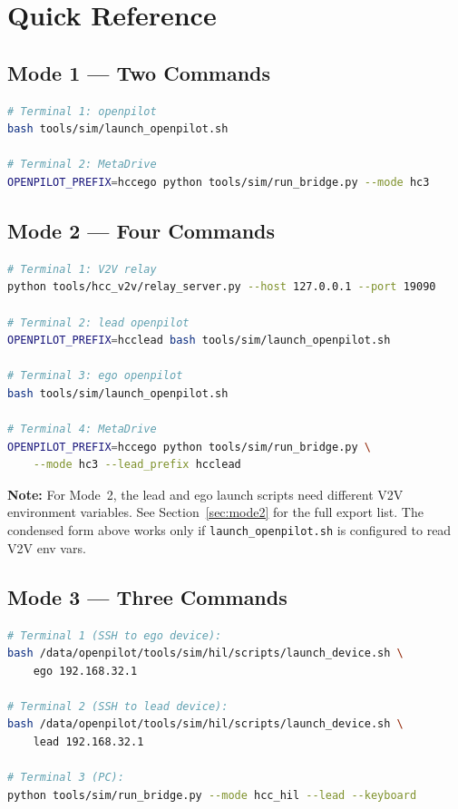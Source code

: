 \documentclass[11pt, letterpaper]{article}
\newcommand{\warn}[1]{%
  \medskip\noindent\colorbox{warnbg}{\parbox{\dimexpr\linewidth-2\fboxsep}{%
    \textbf{Note:} #1}}\medskip}
\begin{document}
\section{Quick Reference}
\label{sec:quickref}

\subsection{Mode 1 --- Two Commands}

\begin{lstlisting}[language=bash]
# Terminal 1: openpilot
bash tools/sim/launch_openpilot.sh

# Terminal 2: MetaDrive
OPENPILOT_PREFIX=hccego python tools/sim/run_bridge.py --mode hc3
\end{lstlisting}

\subsection{Mode 2 --- Four Commands}

\begin{lstlisting}[language=bash]
# Terminal 1: V2V relay
python tools/hcc_v2v/relay_server.py --host 127.0.0.1 --port 19090

# Terminal 2: lead openpilot
OPENPILOT_PREFIX=hcclead bash tools/sim/launch_openpilot.sh

# Terminal 3: ego openpilot
bash tools/sim/launch_openpilot.sh

# Terminal 4: MetaDrive
OPENPILOT_PREFIX=hccego python tools/sim/run_bridge.py \
    --mode hc3 --lead_prefix hcclead
\end{lstlisting}

\warn{For Mode~2, the lead and ego launch scripts need different V2V
environment variables.  See Section~\ref{sec:mode2} for the full
export list.  The condensed form above works only if
\texttt{launch\_openpilot.sh} is configured to read V2V env vars.}

\subsection{Mode 3 --- Three Commands}

\begin{lstlisting}[language=bash]
# Terminal 1 (SSH to ego device):
bash /data/openpilot/tools/sim/hil/scripts/launch_device.sh \
    ego 192.168.32.1

# Terminal 2 (SSH to lead device):
bash /data/openpilot/tools/sim/hil/scripts/launch_device.sh \
    lead 192.168.32.1

# Terminal 3 (PC):
python tools/sim/run_bridge.py --mode hcc_hil --lead --keyboard
\end{lstlisting}
\end{document}
